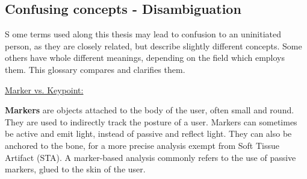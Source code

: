 
{} \mtcaddchapter
\label{Ann:gloss}

\vspace*{-1.6cm}
\begin{flushright}
\section*{\fontsize{20pt}{20pt}\selectfont\textnormal{Confusing concepts - Disambiguation}}
\end{flushright}
\vspace{-0.2cm}


\chead[\fancyplain{}{}]
      {\fancyplain{}{}}
\lfoot[\fancyplain{}{}]
      {\fancyplain{}{}}
\cfoot[\fancyplain{}{\thepage}]
      {\fancyplain{}{\thepage}}
\rfoot[\fancyplain{}{}]%
     {\fancyplain{}{\scriptsize}}


\lettrine[lines=1]{S}{ }ome terms used along this thesis may lead to confusion to an uninitiated person, as they are closely related, but describe slightly different concepts. Some others have whole different meanings, depending on the field which employs them. This glossary compares and clarifies them.

\vspace*{0.7cm}

\noindent\underline{Marker vs. Keypoint:}

\textbf{Markers} are objects attached to the body of the user, often small and round. They are used to indirectly track the posture of a user. Markers can sometimes be active and emit light, instead of passive and reflect light. They can also be anchored to the bone, for a more precise analysis exempt from Soft Tissue Artifact (STA). A marker-based analysis commonly refers to the use of passive markers, glued to the skin of the user.

